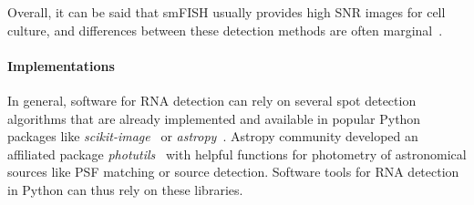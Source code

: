 Overall, it can be said that smFISH usually provides high \ac{SNR} images for cell culture, and differences between these detection methods are often marginal~\cite{smal_quantitative_2010}. 


%




\paragraph{Implementations}

In general, software for RNA detection can rely on several spot detection algorithms that are already implemented and  available in popular Python packages like \emph{scikit-image}~\cite{walt_scikit-image_2014} or \emph{astropy}~\cite{astropy_2018}.
Astropy community developed an affiliated package \emph{photutils}~\cite{larry_bradley_2020_4044744} with helpful functions for photometry of astronomical sources like \ac{PSF} matching or source detection. Software tools for RNA detection in Python can thus rely on these libraries. 

